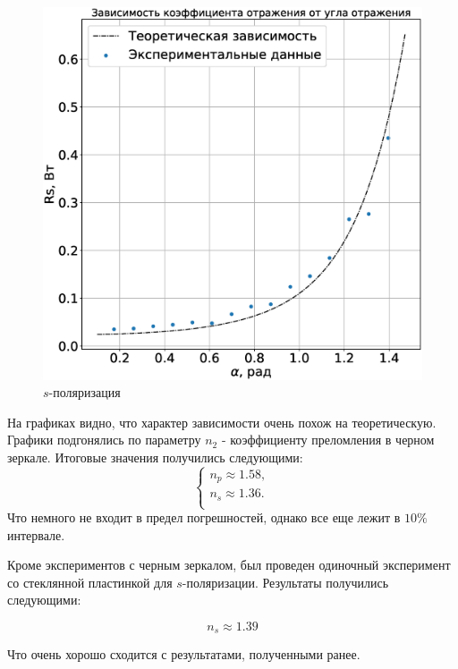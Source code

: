 \documentclass[a4paper,14pt]{extarticle}
\begin{document}
				\newpage
				
				\begin{figure}[h!]
					\centering
					\includegraphics[width=1\linewidth]{Frenele_s.eps}
					\caption{$s$-поляризация}
					\label{fig4}
				\end{figure}
				На графиках видно, что характер зависимости очень похож на теоретическую. Графики подгонялись по параметру $n_2$ - коэффициенту преломления в черном зеркале. Итоговые значения получились следующими:
				\begin{equation}
					\begin{cases}
						n_{p} \approx 1.58, \\
						n_{s} \approx 1.36. \\
					\end{cases}
				\end{equation}
				Что немного не входит в предел погрешностей, однако все еще лежит в $10 \%$ интервале.
				
				Кроме экспериментов с черным зеркалом, был проведен одиночный эксперимент со стеклянной пластинкой для $s$-поляризации. Результаты получились следующими:
				
				\begin{equation}
					n_s \approx 1.39
				\end{equation}
				
				Что очень хорошо сходится с результатами, полученными ранее.
\end{document}
